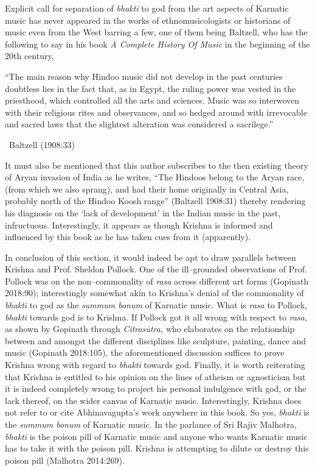 Explicit call for separation of \textit{bhakti} to god from the art aspects of Karnatic music has never appeared in the works of ethnomusicologists or historians of music even from the West barring a few, one of them being Baltzell, who has the following to say in his book \textit{A Complete History Of Music} in the beginning of the 20th century,

\vspace{.1cm}

\begin{myquote}
“The main reason why Hindoo music did not develop in the past centuries doubtless lies in the fact that, as in Egypt, the ruling power was vested in the priesthood, which controlled all the arts and sciences. Music was so interwoven with their religious rites and observances, and so hedged around with irrevocable and sacred laws that the slightest alteration was considered a sacrilege.” 

~\hfill Baltzell (1908:33)
\end{myquote}

It must also be mentioned that this author subscribes to the then existing theory of Aryan invasion of India as he writes, “The Hindoos belong to the Aryan race, (from which we also sprang), and had their home originally in Central Asia, probably north of the Hindoo Koosh range” (Baltzell 1908:31) thereby rendering his diagnosis on the ‘lack of development’ in the Indian music in the past, infructuous. Interestingly, it appears as though Krishna is informed and influenced by this book as he has taken cues from it (apparently).

In conclusion of this section, it would indeed be apt to draw parallels between Krishna and Prof. Sheldon Pollock. One of the ill–grounded observations of Prof. Pollock was on the non–commonality of \textit{rasa} across different art forms (Gopinath 2018:90); interestingly somewhat akin to Krishna’s denial of the commonality of \textit{bhakti} to god as the \textit{summum bonum} of Karnatic music. What is \textit{rasa} to Pollock, \textit{bhakti} towards god is to Krishna. If Pollock got it all wrong with respect to \textit{rasa}, as shown by Gopinath through \textit{Citrasūtra, }who elaborates on the relationship between and amongst the different disciplines like sculpture, painting, dance and music (Gopinath 2018:105), the aforementioned discussion suffices to prove Krishna wrong with regard to \textit{bhakti} towards god. Finally, it is worth reiterating that Krishna is entitled to his opinion on the lines of atheism or agnosticism but it is indeed completely wrong to project his personal indulgence with god, or the lack thereof, on the wider canvas of Karnatic music. Interestingly, Krishna does not refer to or cite Abhinavagupta’s work anywhere in this book. So yes, \textit{bhakti} is the \textit{summum bonum} of Karnatic music. In the parlance of Sri Rajiv Malhotra, \textit{bhakti} is the poison pill of Karnatic music and anyone who wants Karnatic music has to take it with the poison pill. Krishna is attempting to dilute or destroy this poison pill (Malhotra 2014:269).

